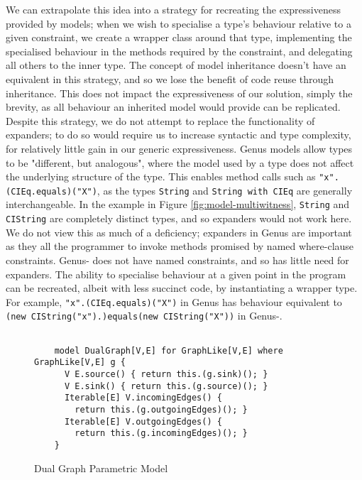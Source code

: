 We can extrapolate this idea into a strategy for recreating the expressiveness provided by models; when we wish to specialise a type's behaviour relative to a given constraint, we create a wrapper class around that type, implementing the specialised behaviour in the methods required by the constraint, and delegating all others to the inner type. The concept of model inheritance doesn't have an equivalent in this strategy, and so we lose the benefit of code reuse through inheritance. This does not impact the expressiveness of our solution, simply the brevity, as all behaviour an inherited model would provide can be replicated. \\

Despite this strategy, we do not attempt to replace the functionality of expanders; to do so would require us to increase syntactic and type complexity, for relatively little gain in our generic expressiveness. Genus models allow types to be "different, but analogous", where the model used by a type does not affect the underlying structure of the type. This enables method calls such as \texttt{"x".(CIEq.equals)("X")}, as the types \texttt{String} and \texttt{String with CIEq} are generally interchangeable. In the example in Figure \ref{fig:model-multiwitness}, \texttt{String} and \texttt{CIString} are completely distinct types, and so expanders would not work here. We do not view this as much of a deficiency; expanders in Genus are important as they all the programmer to invoke methods promised by named where-clause constraints. Genus- does not have named constraints, and so has little need for expanders. The ability to specialise behaviour at a given point in the program can be recreated, albeit with less succinct code, by instantiating a wrapper type. For example, \texttt{"x".(CIEq.equals)("X")} in Genus has behaviour equivalent to \texttt{(new CIString("x").)equals(new CIString("X"))} in Genus-. \\

\begin{figure}[H]
    \centering
    \begin{verbatim}
    
    model DualGraph[V,E] for GraphLike[V,E] where GraphLike[V,E] g {
      V E.source() { return this.(g.sink)(); }
      V E.sink() { return this.(g.source)(); }
      Iterable[E] V.incomingEdges() {
        return this.(g.outgoingEdges)(); }
      Iterable[E] V.outgoingEdges() {
        return this.(g.incomingEdges)(); }
    }
    \end{verbatim}
    \caption{Dual Graph Parametric Model}
    \label{fig:model-parametric}
\end{figure}

